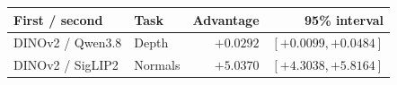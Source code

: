 \begin{tabular}{llrr}
\toprule
First / second & Task & Advantage & 95\% interval\\
\midrule
DINOv2 / Qwen3.8 & Depth & $+0.0292$ & $[+0.0099, +0.0484]$\\
DINOv2 / SigLIP2 & Normals & $+5.0370$ & $[+4.3038, +5.8164]$\\
\bottomrule
\end{tabular}
